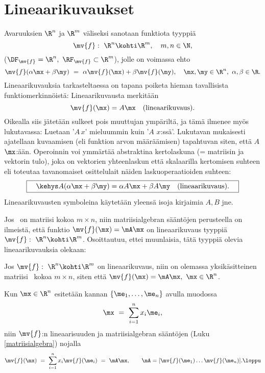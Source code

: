 \section{Lineaarikuvaukset} \label{lineaarikuvaukset}
\alku
{}

Avaruuksien $\R^n$ ja $\R^m$ väliseksi  sanotaan funktiota tyyppiä
\[ 
\mv{f}:\ \R^n \kohti \R^m, \quad m,n \in \N, 
\]
($\DF_{\mv{f}}=\R^n,\ \RF_{\mv{f}}\subset\R^m$), jolle on voimassa ehto
\begin{equation} \label{lineaarikuvauksen ehto} 
\mv{f}(\alpha \mx + \beta \my)\ =\ \alpha \mv{f}(\mx) + \beta \mv{f}(\my), \quad 
                                         \mx,\my \in \R^n,\ \alpha,\beta \in \R.
\end{equation}
Lineaarikuvauksia tarkasteltaessa on tapana poiketa hieman tavallisista funktiomerkinnöistä: 
Lineaarikuvausta merkitään
\[ 
\mv{f}(\mx) = A \mx \quad \text{(lineaarikuvaus)}. 
\]
Oikealla siis jätetään sulkeet pois muuttujan ympäriltä, ja tämä ilmenee myös lukutavassa: 
Luetaan '$A\,x$' mieluummin kuin '$A$ $x$:ssä'. Lukutavan mukaisesti ajatellaan kuvaamisen 
(eli funktion arvon määräämisen) tapahtuvan siten, että $A$  $\mx$:ään. 
Operoinnin voi ymmärtää abstraktina kertolaskuna (= matriisin ja vektorin tulo), joka on
vektorien yhteenlaskun että skalaarilla kertomisen suhteen  eli toteutaa
tavanomaiset osittelulait näiden laskuoperaatioiden suhteen:
\[ 
\boxed{ \quad\kehys A(\alpha \mx + \beta \my) 
            = \alpha A \mx + \beta A \my \quad \text{(lineaarikuvaus)}. \quad } 
\]
Lineaarikuvausten symboleina käytetään yleensä isoja kirjaimia $A,B$ jne. 

Jos \mA\ on matriisi kokoa $m \times n$, niin matriisialgebran sääntöjen perusteella on 
ilmeistä, että funktio $\mv{f}(\mx) = \mA \mx$ on lineaarikuvaus tyyppiä 
$\mv{f}:\ \R^n \kohti \R^m$. Osoittautuu, ettei muunlaisia, tätä tyyppiä olevia
lineaarikuvauksia olekaan:
\begin{Prop} \label{lineaarikuvaukset ja matriisit} Jos $\mv{f}:\ \R^n \kohti \R^m$ on 
lineaarikuvaus, niin on olemassa yksikäsitteinen matriisi \mA\ kokoa $m \times n$, siten että
$\mv{f}(\mx) = \mA\mx,\ \mx \in \R^n$. \end{Prop}
\tod Kun $\mx \in \R^n$ esitetään kannan $\{\me_1, \ldots, \me_n\}$ avulla muodossa
\[ 
\mx\ =\ \sum_{i=1}^n x_i \me_i, 
\]
niin $\mv{f}$:n lineaarisuuden ja matriisialgebran sääntöjen (Luku \ref{matriisialgebra}) 
nojalla
\[ 
\mv{f}(\mx)\ =\ \sum_{i=1}^n x_i \mv{f}(\me_i)\ =\ \mA\mx, \qquad 
                             \mA=[\mv{f}(\me_1) \ldots \mv{f}(\me_n)]. \loppu
\]

